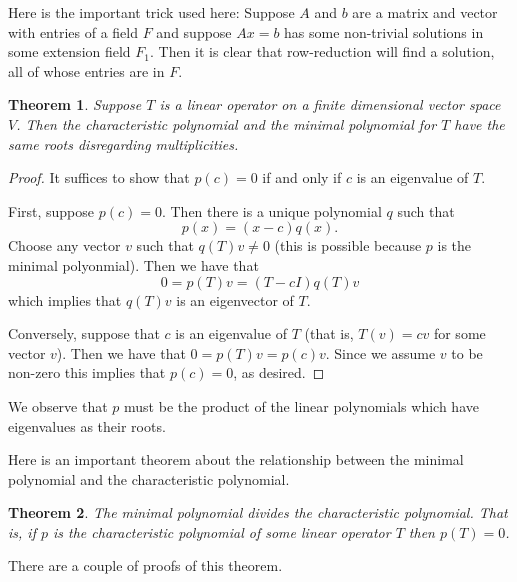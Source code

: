 \documentclass[12pt]{article}
\theoremstyle{plain}
\newtheorem{thm}{Theorem}
\theoremstyle{definition}
\begin{document}
Here is the important trick used here: Suppose $A$ and $b$ are a matrix and vector with entries of a field $F$ and suppose $Ax = b$ has some non-trivial solutions in some extension field $F_1$. Then it is clear that row-reduction will find a solution, all of whose entries are in $F$.

\begin{thm}
Suppose $T$ is a linear operator on a finite dimensional vector space $V$. Then the characteristic polynomial and the minimal polynomial for $T$ have the same roots disregarding multiplicities.
\end{thm}

\begin{proof}
It suffices to show that $p(c) = 0$ if and only if $c$ is an eigenvalue of $T$. 

First, suppose $p(c) = 0$. Then there is a unique polynomial $q$ such that \[p(x) = (x - c)q(x).\] Choose any vector $v$ such that $q(T)v \neq 0$ (this is possible because $p$ is the minimal polyonmial). Then we have that 
\[0 = p(T)v = (T - cI)q(T)v\] which implies that $q(T)v$ is an eigenvector of $T$.

Conversely, suppose that $c$ is an eigenvalue of $T$ (that is, $T(v) = cv$ for some vector $v$). Then we have that $0 = p(T)v = p(c)v$. Since we assume $v$ to be non-zero this implies that $p(c) = 0$, as desired. 
\end{proof}

We observe that $p$ must be the product of the linear polynomials which have eigenvalues as their roots.

Here is an important theorem about the relationship between the minimal polynomial and the characteristic polynomial.

\begin{thm}
The minimal polynomial divides the characteristic polynomial. That is, if $p$ is the characteristic polynomial of some linear operator $T$ then $p(T) = 0$.
\end{thm}

There are a couple of proofs of this theorem.
\end{document}
